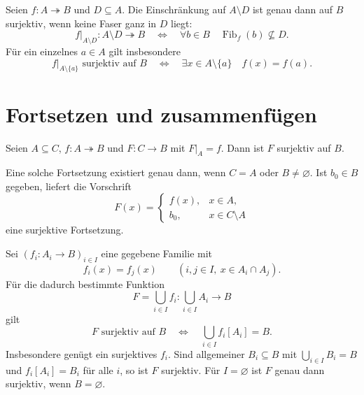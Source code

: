 \begin{theorem}
\label{b07guide:thm:deletion}
Seien $f\colon A\twoheadrightarrow B$ und $D\subseteq A$.
Die Einschränkung auf $A\setminus D$ ist genau dann auf $B$
surjektiv, wenn keine Faser ganz in $D$ liegt:
\[
 f|_{A\setminus D}\colon A\setminus D\twoheadrightarrow B
 \quad\Longleftrightarrow\quad
 \forall b\in B\quad \operatorname{Fib}_f(b)\not\subseteq D.
\]
Für ein einzelnes $a\in A$ gilt insbesondere
\[
 f|_{A\setminus\{a\}}\text{ surjektiv auf }B
 \quad\Longleftrightarrow\quad
 \exists x\in A\setminus\{a\}\quad f(x)=f(a).
\]
\end{theorem}

\section{Fortsetzen und zusammenfügen}

\begin{theorem}
\label{b07guide:thm:extension}
Seien $A\subseteq C$, $f\colon A\twoheadrightarrow B$ und
$F\colon C\to B$ mit $F|_A=f$. Dann ist $F$ surjektiv auf $B$.

Eine solche Fortsetzung existiert genau dann, wenn
$C=A$ oder $B\ne\varnothing$.
Ist $b_0\in B$ gegeben, liefert die Vorschrift
\[
 F(x)=
 \begin{cases}
 f(x),&x\in A,\\
 b_0,&x\in C\setminus A
 \end{cases}
\]
eine surjektive Fortsetzung.
\end{theorem}

\begin{theorem}
\label{b07guide:thm:gluing}
Sei $(f_i\colon A_i\to B)_{i\in I}$ eine gegebene Familie mit
\[
 f_i(x)=f_j(x)\qquad
 (i,j\in I,\ x\in A_i\cap A_j).
\]
Für die dadurch bestimmte Funktion
\[
 F=\bigcup_{i\in I}f_i\colon\bigcup_{i\in I}A_i\to B
\]
gilt
\[
 F\text{ surjektiv auf }B
 \quad\Longleftrightarrow\quad
 \bigcup_{i\in I}f_i[A_i]=B.
\]
Insbesondere genügt ein surjektives $f_i$.
Sind allgemeiner $B_i\subseteq B$ mit
$\bigcup_{i\in I}B_i=B$ und $f_i[A_i]=B_i$ für alle $i$,
so ist $F$ surjektiv. Für $I=\varnothing$ ist $F$ genau dann
surjektiv, wenn $B=\varnothing$.
\end{theorem}